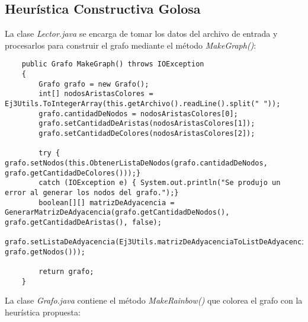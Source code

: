 \subsection{Heurística Constructiva Golosa}

La clase \emph{Lector.java} se encarga de tomar los datos del archivo de entrada y procesarlos para construir el grafo mediante el método \textit{MakeGraph()}:\\

\begin{lstlisting}
	public Grafo MakeGraph() throws IOException
	{
		Grafo grafo = new Grafo();
		int[] nodosAristasColores = Ej3Utils.ToIntegerArray(this.getArchivo().readLine().split(" "));
		grafo.cantidadDeNodos = nodosAristasColores[0];
		grafo.setCantidadDeAristas(nodosAristasColores[1]);
		grafo.setCantidadDeColores(nodosAristasColores[2]);

		try { grafo.setNodos(this.ObtenerListaDeNodos(grafo.cantidadDeNodos, grafo.getCantidadDeColores()));}
		catch (IOException e) { System.out.println("Se produjo un error al generar los nodos del grafo.");}
		boolean[][] matrizDeAdyacencia = GenerarMatrizDeAdyacencia(grafo.getCantidadDeNodos(), grafo.getCantidadDeAristas(), false);
		grafo.setListaDeAdyacencia(Ej3Utils.matrizDeAdyacenciaToListDeAdyacencia(matrizDeAdyacencia, grafo.getNodos()));

		return grafo;
	}

\end{lstlisting}


La clase \emph{Grafo.java} contiene el método \textit{MakeRainbow()} que colorea el grafo con la heurística \newline propuesta: \\

